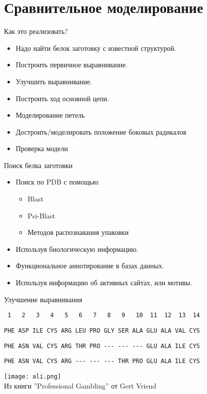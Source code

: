 \section{Сравнительное моделирование}
\begin{frame}
{Как это реализовать?}
	\begin{itemize}
\item
Надо найти белок заготовку с известной структурой.
\item
Построить первичное выравнивание.
\item
Улучшить выравнивание. 
\item
Построить ход основной цепи.
\item
Моделирование петель
\item
Достроить/моделировать положение боковых радикалов
\item
Проверка модели
   \end{itemize}
\end{frame}
\begin{frame}
{Поиск белка заготовки}
	\begin{itemize}
		\item 
Поиск по PDB с помощью:
\begin{itemize}
	\item
Blast
    \item 
Psi-Blast
    \item
Методов распознавания упаковки
\end{itemize}
\vspace{.5cm}
\item
Используя биологическую информацию.
\item
Функциональное аннотирование в базах данных.
\item
Используя информацию об активных  сайтах, или мотивы.
\end{itemize}
\end{frame}
\begin{frame}
[fragile]{Улучшение выравнивания}
	\small{
\begin{verbatim}
 1   2   3   4   5   6   7   8   9   10  11  12  13  14
\end{verbatim}
\vspace{-0.5cm}\color{green}\begin{verbatim}
PHE ASP ILE CYS ARG LEU PRO GLY SER ALA GLU ALA VAL CYS \end{verbatim}
\vspace{-0.5cm}\color{red}\begin{verbatim}
PHE ASN VAL CYS ARG THR PRO --- --- --- GLU ALA ILE CYS \end{verbatim}
\vspace{-0.5cm}\color{blue}\begin{verbatim}
PHE ASN VAL CYS ARG --- --- --- THR PRO GLU ALA ILE CYS \end{verbatim}
}
\begin{center}
		\texttt{[image: ali.png]}  \\
		Из книги ”Professional Gambling” от Gert Vriend 
\end{center}
\end{frame}
